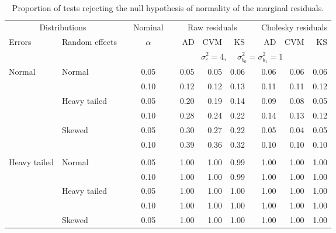 \begin{table}[ht]
\begin{scriptsize}
\begin{tabular}{ll p{.1cm} c p{.1cm} rrr p{.1cm} rrr p{.1cm} rrr}
   \hline
\end{tabular}
\end{scriptsize}
\end{table}

\begin{table}[ht]
\centering
\caption{\label{tab:evalmarginal} Proportion of tests rejecting the null hypothesis of normality of the marginal residuals.}
\begin{scriptsize}
\begin{tabular}{ll p{.1cm} c p{.1cm} rrr p{.1cm} rrr}
  \hline
  \multicolumn{2}{c}{Distributions}& & Nominal & &  \multicolumn{3}{c}{Raw residuals} & & \multicolumn{3}{c}{Cholesky residuals} \\ \cline{1-2} \cline{6-8} \cline{10-12}
  Errors & Random effects & & $\alpha$ & & AD & CVM & KS & & AD & CVM & KS \\ 
   \hline
& && && \multicolumn{6}{c}{$\sigma_{\varepsilon}^2 = 4$, \ \ $\sigma_{b_0}^2 = \sigma_{b_1}^2 = 1$} \\ \cline{6-12}
\rowcolor{gray!20} Normal       & Normal       && 0.05 &&  0.05 & 0.05 & 0.06 && 0.06 & 0.06 & 0.06 \\ 
\rowcolor{gray!20}             &              && 0.10 &&  0.12 & 0.12 & 0.13 && 0.11 & 0.11 & 0.12 \\ 
\rowcolor{gray!20}             & Heavy tailed && 0.05 &&  0.20 & 0.19 & 0.14 && 0.09 & 0.08 & 0.05 \\ 
\rowcolor{gray!20}             &              && 0.10 &&  0.28 & 0.24 & 0.22 && 0.14 & 0.13 & 0.12 \\ 
\rowcolor{gray!20}             & Skewed       && 0.05 &&  0.30 & 0.27 & 0.22 && 0.05 & 0.04 & 0.05 \\ 
\rowcolor{gray!20}             &              && 0.10 &&  0.39 & 0.36 & 0.32 && 0.10 & 0.10 & 0.10 \\ 
             &&&&&&&&&&&\\
Heavy tailed & Normal       && 0.05 &&  1.00 & 1.00 & 0.99 && 1.00 & 1.00 & 1.00 \\ 
             &              && 0.10 &&  1.00 & 1.00 & 0.99 && 1.00 & 1.00 & 1.00 \\ 
             & Heavy tailed && 0.05 &&  1.00 & 1.00 & 1.00 && 1.00 & 1.00 & 1.00 \\ 
             &              && 0.10 &&  1.00 & 1.00 & 1.00 && 1.00 & 1.00 & 1.00 \\ 
             & Skewed       && 0.05 &&  1.00 & 1.00 & 1.00 && 1.00 & 1.00 & 1.00 \\ 

\end{tabular}
\end{scriptsize}
\end{table}
